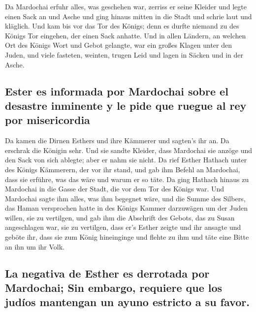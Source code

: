  Da Mardochai erfuhr alles, was geschehen war, zerriss er
seine Kleider und legte einen Sack an und Asche und ging hinaus mitten
in die Stadt und schrie laut und kläglich.  Und kam bis
vor das Tor des Königs; denn es durfte niemand zu des Königs Tor
eingehen, der einen Sack anhatte.  Und in allen Ländern,
an welchen Ort des Königs Wort und Gebot gelangte, war ein großes Klagen
unter den Juden, und viele fasteten, weinten, trugen Leid und lagen in
Säcken und in der Asche.

\hypertarget{ester-es-informada-por-mardochai-sobre-el-desastre-inminente-y-le-pide-que-ruegue-al-rey-por-misericordia}{%
\subsection{Ester es informada por Mardochai sobre el desastre inminente
y le pide que ruegue al rey por
misericordia}\label{ester-es-informada-por-mardochai-sobre-el-desastre-inminente-y-le-pide-que-ruegue-al-rey-por-misericordia}}

 Da kamen die Dirnen Esthers und ihre Kämmerer und
sagten's ihr an. Da erschrak die Königin sehr. Und sie sandte Kleider,
dass Mardochai sie anzöge und den Sack von sich ablegte; aber er nahm
sie nicht.  Da rief Esther Hathach unter des Königs
Kämmerern, der vor ihr stand, und gab ihm Befehl an Mardochai, dass sie
erführe, was das wäre und warum er so täte.  Da ging
Hathach hinaus zu Mardochai in die Gasse der Stadt, die vor dem Tor des
Königs war.  Und Mardochai sagte ihm alles, was ihm
begegnet wäre, und die Summe des Silbers, das Haman versprochen hatte in
des Königs Kammer darzuwägen um der Juden willen, sie zu vertilgen,
 und gab ihm die Abschrift des Gebots, das zu Susan
angeschlagen war, sie zu vertilgen, dass er's Esther zeigte und ihr
ansagte und geböte ihr, dass sie zum König hineinginge und flehte zu ihm
und täte eine Bitte an ihn um ihr Volk.

\hypertarget{la-negativa-de-esther-es-derrotada-por-mardochai-sin-embargo-requiere-que-los-juduxedos-mantengan-un-ayuno-estricto-a-su-favor.}{%
\subsection{La negativa de Esther es derrotada por Mardochai; Sin
embargo, requiere que los judíos mantengan un ayuno estricto a su
favor.}\label{la-negativa-de-esther-es-derrotada-por-mardochai-sin-embargo-requiere-que-los-juduxedos-mantengan-un-ayuno-estricto-a-su-favor.}}

